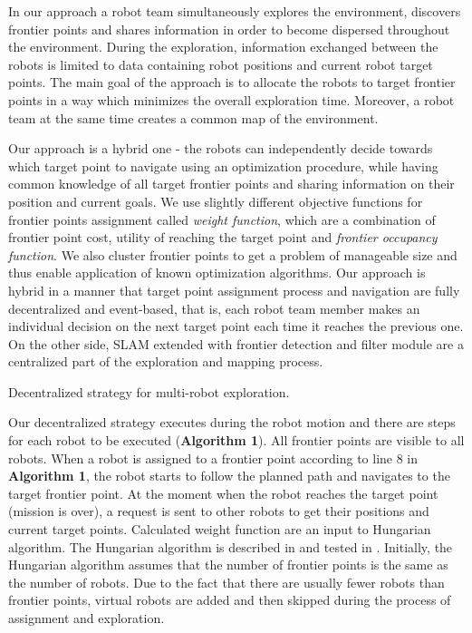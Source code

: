 In our approach a robot team simultaneously explores the environment, discovers frontier points and shares information in order to become dispersed throughout the environment. During the exploration, information exchanged between the robots is limited to data containing robot positions and current robot target points. The main goal of the approach is to allocate the robots to target frontier points in a way which minimizes the overall exploration time. Moreover, a robot team at the same time creates a common map of the environment. 

Our approach is a hybrid one - the robots can independently decide towards which target point to navigate using an optimization procedure, while having common knowledge of all target frontier points and sharing information on their position and current goals. We use slightly different objective functions for frontier points assignment called \textit{weight function}, which are a combination of frontier point cost, utility of reaching the target point and \textit{frontier occupancy function}. We also cluster frontier points to get a problem of manageable size and thus enable application of known optimization algorithms. 
Our approach is hybrid in a manner that target point assignment process and navigation are fully decentralized and event-based, that is, each robot team member makes an individual decision on the next target point each time it reaches the previous one. On the other side, SLAM extended with frontier detection and filter module are a centralized part of the exploration and mapping process.

\begin{algorithm}[b!]
	\label{algorithm1}
	\caption{Decentralized strategy for multi-robot exploration.}
\end{algorithm}


Our decentralized strategy executes during the robot motion and there are steps for each robot to be executed (\textbf{Algorithm 1}). All frontier points are visible to all robots.
When a robot is assigned to a frontier point according to line 8 in \textbf{Algorithm 1}, the robot starts to follow the planned path and navigates to the target frontier point. At the moment when the robot reaches the target point (mission is over), a request is sent to other robots to get their positions and current target points. Calculated weight function are an input to Hungarian algorithm. 
The Hungarian algorithm is described in \cite{Kuhn1955} and tested in \cite{Kulich2015}. Initially, the Hungarian algorithm assumes that the number of frontier points is the same as the number of robots. Due to the fact that there are usually fewer robots than frontier points, virtual robots are added and then skipped during the process of assignment and exploration. 

